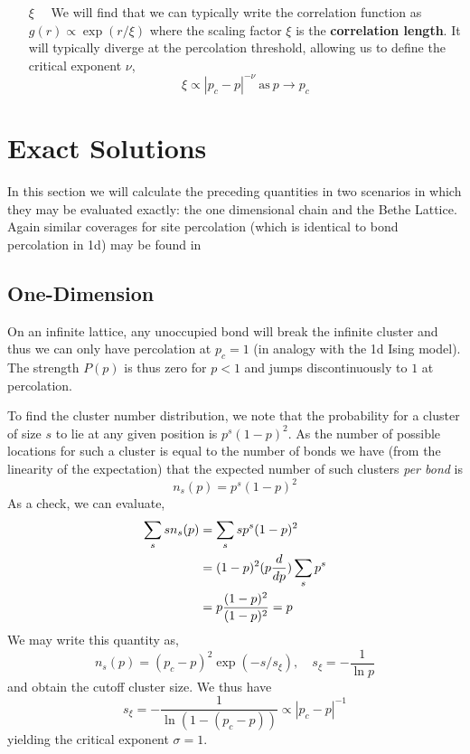 \begin{enumerate}
\item[$\xi\quad$] We will find that we can typically write the correlation function as
\(g(r) \propto \exp{(r/\xi)}\) where the scaling factor $\xi$ is the
\textbf{correlation length}. It will typically diverge at the percolation threshold,
allowing us to define the critical exponent $\nu$,
\[ \xi \propto |p_c - p|^{-\nu} \ \text{as}\ p\to p_c \]
\end{enumerate}


\section{Exact Solutions}

In this section we will calculate the preceding quantities in two scenarios in which they
may be evaluated exactly: the one dimensional chain and the Bethe Lattice.  Again
similar coverages for site percolation (which is identical to bond percolation in 1d)
may be found in \cite{stauffer94}\cite{christensen02}

\subsection{One-Dimension}

On an infinite lattice, any unoccupied bond will break the infinite cluster and thus
we can only have percolation at $p_c = 1$ (in analogy with the 1d Ising model).  The
strength $P(p)$ is thus zero for $p<1$ and jumps discontinuously to $1$ at percolation.

To find the cluster number distribution, we note that the probability for a cluster
of size $s$ to lie at any given position is $p^s(1-p)^2$.  As the number of possible
locations for such a cluster is equal to the number of bonds we have (from the linearity
of the expectation) that the expected number of such clusters \emph{per bond} is
\[n_s(p) = p^s(1-p)^2\]
As a check, we can evaluate,
\begin{align*}
\sum_s sn_s(p) &= \sum_s sp^s(1-p)^2 \\
 &= (1-p)^2 (p\frac{d }{d p})\sum_s p^s \\
 &= p\frac{(1-p)^2}{(1-p)^2} = p \\
\end{align*}
We may write this
quantity as,
\[n_s(p) = (p_c - p)^2\exp{(-s/s_\xi)}, \quad s_\xi = -\frac{1}{\ln{p}}\]
and obtain the cutoff cluster size.  We thus have
\[s_\xi = -\frac{1}{\ln(1 - (p_c - p))}\propto |p_c - p|^{-1}\]
yielding the critical exponent $\sigma=1$.

